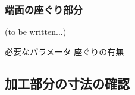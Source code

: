 \subsubsection{端面の座ぐり部分\TBW}
(to be written...)
\begin{Parameter}{必要なパラメータ}
座ぐりの有無
\end{Parameter}


\subsection{加工部分の寸法の確認}

